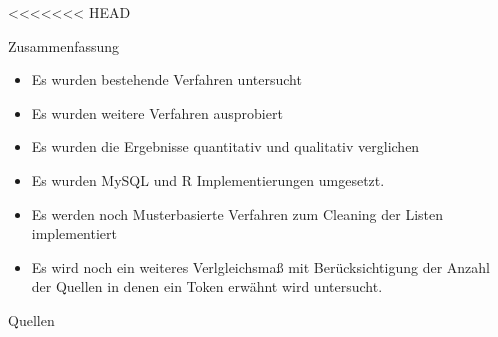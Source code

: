 \documentclass{beamer}
\begin{document}
<<<<<<< HEAD

\begin{frame}{Zusammenfassung}
	\begin{itemize}
		\item{Es wurden bestehende Verfahren untersucht}
		\item{Es wurden weitere Verfahren ausprobiert}
		\item{Es wurden die Ergebnisse quantitativ und qualitativ verglichen}
		\item{Es wurden MySQL und R Implementierungen umgesetzt.}
		\item{Es werden noch Musterbasierte Verfahren zum Cleaning der Listen implementiert}
		\item{Es wird noch ein weiteres Verlgleichsmaß mit Ber\"ucksichtigung der Anzahl der Quellen in denen ein Token erw\"ahnt wird untersucht.}
	\end{itemize}
\end{frame}


\begin{frame}[allowframebreaks]{Quellen}
	\nocite{*}
	
    
\end{frame}
\end{document}
